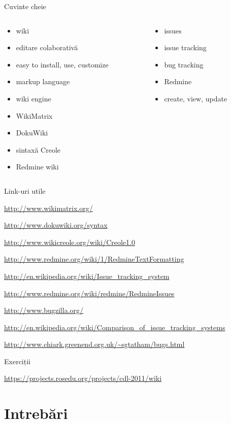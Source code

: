 \documentclass{beamer}
\begin{document}
\begin{frame}{Cuvinte cheie}
  \begin{columns}
    \begin{column}[l]{0.5\textwidth}
      \begin{itemize}
        \item wiki
        \item editare colaborativă
        \item easy to install, use, customize
        \item markup language
        \item wiki engine
        \item WikiMatrix
        \item DokuWiki
        \item sintaxă Creole
        \item Redmine wiki
      \end{itemize}
    \end{column}
    \begin{column}[l]{0.5\textwidth}
      \begin{itemize}
        \item issues
        \item issue tracking
        \item bug tracking
        \item Redmine
        \item create, view, update
      \end{itemize}
    \end{column}
  \end{columns}
\end{frame}

\begin{frame}{Link-uri utile}
  \begin{itemize}
    {\footnotesize
    \item \url{http://www.wikimatrix.org/}
    \item \url{http://www.dokuwiki.org/syntax}
    \item \url{http://www.wikicreole.org/wiki/Creole1.0}
    \item \url{http://www.redmine.org/wiki/1/RedmineTextFormatting}
    \item \url{http://en.wikipedia.org/wiki/Issue\_tracking\_system}
    \item \url{http://www.redmine.org/wiki/redmine/RedmineIssues}
    \item \url{http://www.bugzilla.org/}
    \item
\url{http://en.wikipedia.org/wiki/Comparison\_of\_issue\_tracking\_systems}
    \item \url{http://www.chiark.greenend.org.uk/~sgtatham/bugs.html}
    }
  \end{itemize}
\end{frame}

\begin{frame}{Exerciții}
  \begin{itemize}
    {\small
    \item \url{https://projects.rosedu.org/projects/cdl-2011/wiki}
    }
  \end{itemize}
\end{frame}

\section{Intrebări}
\end{document}
